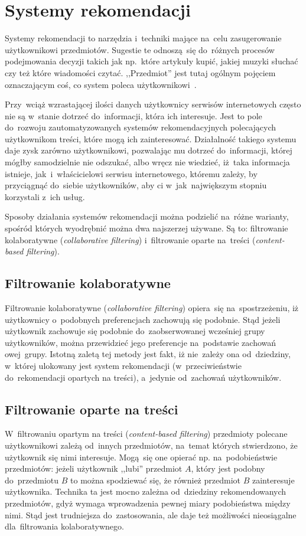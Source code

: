 \documentclass[pl]{minipw} %
\begin{document}
\section{Systemy rekomendacji}

Systemy rekomendacji to narzędzia i~techniki mające na~celu zasugerowanie użytkownikowi przedmiotów. Sugestie te odnoszą~się do~różnych procesów podejmowania decyzji takich jak np.~które artykuły kupić, jakiej muzyki słuchać czy też które wiadomości czytać. ,,Przedmiot'' jest tutaj ogólnym pojęciem oznaczającym coś, co system poleca użytkownikowi~\cite{handbook}. 

Przy~wciąż wzrastającej ilości danych użytkownicy serwisów internetowych często nie są w~stanie dotrzeć do~informacji, która ich interesuje. Jest to pole do~rozwoju zautomatyzowanych systemów rekomendacyjnych polecających użytkownikom treści, które mogą ich zainteresować. Działalność takiego systemu daje zysk zarówno użytkownikowi, pozwalając mu dotrzeć do~informacji, której mógłby samodzielnie nie odszukać, albo wręcz nie wiedzieć, iż~taka informacja istnieje, jak~i~właścicielowi serwisu internetowego, któremu zależy, by przyciągnąć do~siebie użytkowników, aby ci w~jak~największym stopniu korzystali z~ich usług.

Sposoby działania systemów rekomendacji można podzielić na~różne warianty, spośród których wyodrębnić można dwa najszerzej używane. Są to: filtrowanie kolaboratywne (\textit{collaborative filtering}) i~filtrowanie oparte na~treści (\textit{content-based filtering}).

\subsection{Filtrowanie kolaboratywne}
Filtrowanie kolaboratywne (\textit{collaborative filtering}) opiera~się na~spostrzeżeniu, iż użytkownicy o~podobnych preferencjach zachowują się podobnie. Stąd jeżeli użytkownik zachowuje się podobnie do~zaobserwowanej wcześniej grupy użytkowników, można przewidzieć jego preferencje na~podstawie zachowań owej~grupy. Istotną zaletą tej metody jest fakt, iż nie~zależy ona od~dziedziny, w~której ulokowany jest system rekomendacji (w~przeciwieństwie do~rekomendacji opartych na treści), a~jedynie od~zachowań użytkowników.
\subsection{Filtrowanie oparte na treści}
W~filtrowaniu opartym na treści (\textit{content-based filtering}) przedmioty polecane użytkownikowi zależą od~innych przedmiotów, na~temat których stwierdzono, że użytkownik się nimi interesuje. Mogą~się one opierać np. na~podobieństwie przedmiotów: jeżeli użytkownik ,,lubi'' przedmiot $A$, który jest podobny do~przedmiotu $B$ to można spodziewać się, że również przedmiot $B$ zainteresuje użytkownika. Technika ta jest mocno zależna od~dziedziny rekomendowanych przedmiotów, gdyż wymaga wprowadzenia pewnej miary podobieństwa między nimi. Stąd jest trudniejsza do~zastosowania, ale daje też możliwości nieosiągalne dla~filtrowania kolaboratywnego.
\end{document}
